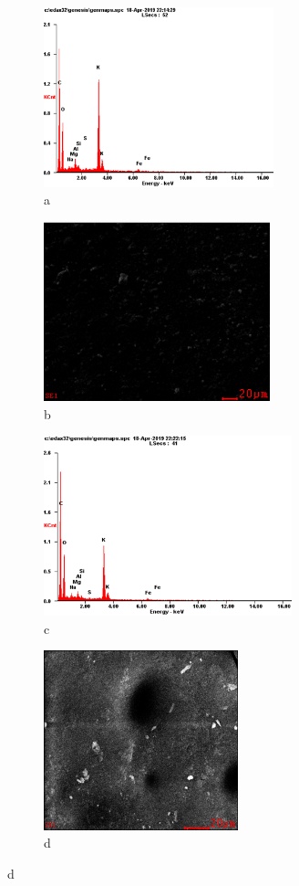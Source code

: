 \begin{figure}[H]
    \centering
    \begin{subfigure}[t]{0.45\textwidth}
        \centering
        \includegraphics[height=5.2cm]{media/chem2/image87}
        \caption*{a}
    \end{subfigure}
    \begin{subfigure}[t]{0.45\textwidth}
        \centering
        \includegraphics[height=5.2cm]{media/chem2/image88}
        \caption*{b}
    \end{subfigure}
    
    \begin{subfigure}[t]{0.45\textwidth}
        \centering
        \includegraphics[height=5.2cm]{media/chem2/image89}
        \caption*{c}
    \end{subfigure}
    \begin{subfigure}[t]{0.45\textwidth}
        \centering
        \includegraphics[height=5.2cm]{media/chem2/image90}
        \caption*{d}
    \end{subfigure}
    

\end{figure}
